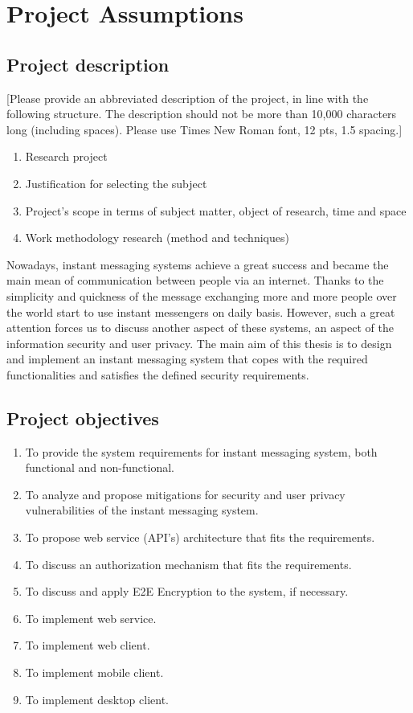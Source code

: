 \chapter{Project Assumptions}\label{ch:project-assumptions}


\section{Project description}\label{sec:project-description}
[Please provide an abbreviated description of the project, in line with the following structure.
The description should not be more than 10,000 characters long (including spaces).
Please use Times New Roman font, 12 pts, 1.5 spacing.]
\begin{enumerate}
    \item Research project
    \item Justification for selecting the subject
    \item Project's scope in terms of subject matter, object of research, time and space
    \item Work methodology research (method and techniques)
\end{enumerate}

Nowadays, instant messaging systems achieve a great success and became the main mean of communication
between people via an internet.
Thanks to the simplicity and quickness of the message exchanging more and more people over the world start to use
instant messengers on daily basis.
However, such a great attention forces us to discuss another aspect of these systems, an aspect of the
information security and user privacy.
The main aim of this thesis is to design and implement an instant messaging system
that copes with the required functionalities and satisfies the defined security requirements.


\section{Project objectives}\label{sec:project-objectives}
\begin{enumerate}
    \item To provide the system requirements for instant messaging system, both functional and non-functional.
    \item To analyze and propose mitigations for security and user privacy vulnerabilities of the instant messaging system.
    \item To propose web service (API's) architecture that fits the requirements.
    \item To discuss an authorization mechanism that fits the requirements.
    \item To discuss and apply E2E Encryption to the system, if necessary.
    \item To implement web service.
    \item To implement web client.
    \item To implement mobile client.
    \item To implement desktop client.
\end{enumerate}